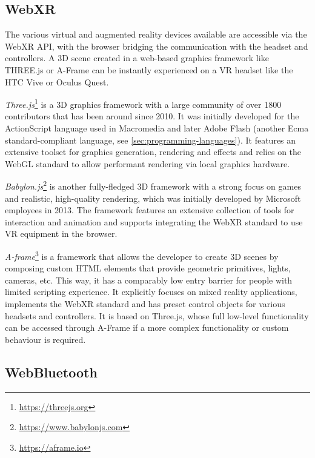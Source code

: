 \subsection{WebXR}
\label{subsec:webxr}

The various virtual and augmented reality devices available are accessible via the \ac{WebXR} \ac{API}, with the browser bridging the communication with the headset and controllers.
A \ac{3D} scene created in a web-based graphics framework like THREE.js or A-Frame can be instantly experienced on a \ac{VR} headset like the HTC Vive or Oculus Quest.



\emph{Three.js}\footnote{\url{https://threejs.org}} is a \ac{3D} graphics framework with a large community of over 1800 contributors that has been around since 2010.
It was initially developed for the ActionScript language used in Macromedia and later Adobe Flash (another Ecma standard-compliant language, see \autoref{sec:programming-languages}).
It features an extensive toolset for graphics generation, rendering and effects and relies on the WebGL standard to allow performant rendering via local graphics hardware.

\emph{Babylon.js}\footnote{\url{https://www.babylonjs.com}} is another fully-fledged \ac{3D} framework with a strong focus on games and realistic, high-quality rendering, which was initially developed by Microsoft employees in 2013.
The framework features an extensive collection of tools for interaction and animation and supports integrating the \ac{WebXR} standard to use \ac{VR} equipment in the browser.

\emph{A-frame}\footnote{\url{https://aframe.io}} is a framework that allows the developer to create \ac{3D} scenes by composing custom \ac{HTML} elements that provide geometric primitives, lights, cameras, etc.
This way, it has a comparably low entry barrier for people with limited scripting experience.
It explicitly focuses on mixed reality applications, implements the WebXR standard and has preset control objects for various headsets and controllers.
It is based on Three.js, whose full low-level functionality can be accessed through A-Frame if a more complex functionality or custom behaviour is required.

\subsection{WebBluetooth}
\label{subsec:webbluetooth}

